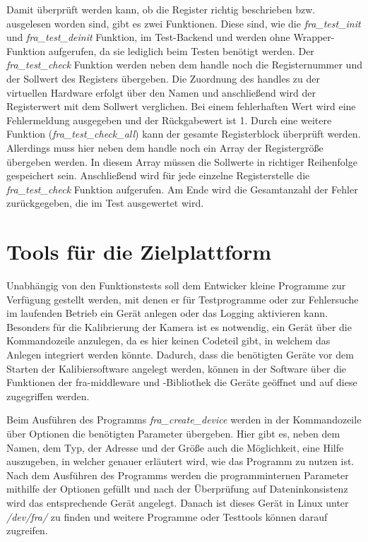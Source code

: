 Damit überprüft werden kann, ob die Register richtig beschrieben bzw. ausgelesen worden sind, gibt es zwei Funktionen. Diese sind, wie die \textit{fra\_test\_init} und \textit{fra\_test\_deinit} Funktion, im Test-Backend und werden ohne Wrapper-Funktion aufgerufen, da sie lediglich beim Testen benötigt werden.
Der \textit{fra\_test\_check} Funktion werden neben dem \gls{handle} noch die Registernummer und der Sollwert des Registers übergeben. Die Zuordnung des \gls{handle}s zu der virtuellen Hardware erfolgt über den Namen und anschließend wird der Registerwert mit dem Sollwert verglichen. Bei einem fehlerhaften Wert wird eine Fehlermeldung ausgegeben und der Rückgabewert ist 1.
Durch eine weitere Funktion (\textit{fra\_test\_check\_all}) kann der gesamte Registerblock überprüft werden. Allerdings muss hier neben dem \gls{handle} noch ein Array der Registergröße übergeben werden. In diesem Array müssen die Sollwerte in richtiger Reihenfolge gespeichert sein. Anschließend wird für jede einzelne Registerstelle die \textit{fra\_test\_check} Funktion aufgerufen. Am Ende wird die Gesamtanzahl der Fehler zurückgegeben, die im Test ausgewertet wird.\\




\section{Tools für die Zielplattform}
Unabhängig von den Funktionstests soll dem Entwicker kleine Programme zur Verfügung gestellt werden, mit denen er für Testprogramme oder zur Fehlersuche im laufenden Betrieb ein Gerät anlegen oder das Logging aktivieren kann. \\


Besonders für die Kalibrierung der Kamera ist es notwendig, ein Gerät über die Kommandozeile anzulegen, da es hier keinen Codeteil gibt, in welchem das Anlegen integriert werden könnte. Dadurch, dass die benötigten Geräte vor dem Starten der Kalibiersoftware angelegt werden, können in der Software über die Funktionen der \ac{fra}-\gls{middleware} und -Bibliothek die Geräte geöffnet und auf diese zugegriffen werden.


Beim Ausführen des Programms \textit{fra\_create\_device} werden in der Kommandozeile über Optionen die benötigten Parameter übergeben. Hier gibt es, neben dem Namen, dem Typ, der Adresse und der Größe auch die Möglichkeit, eine Hilfe auszugeben, in welcher genauer erläutert wird, wie das Programm zu nutzen ist. 
Nach dem Ausführen des Programms werden die programminternen Parameter mithilfe der Optionen gefüllt und nach der Überprüfung auf Dateninkonsistenz wird das entsprechende Gerät angelegt. 
Danach ist dieses Gerät in Linux unter \textit{/dev/fra/} zu finden und weitere Programme oder Testtools können darauf zugreifen.\\

